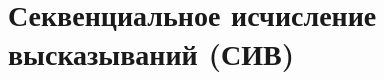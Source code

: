 \documentclass[main]{subfiles}
\begin{document}
\chapter{Секвенциальное исчисление высказываний (СИВ)}
\end{document}
